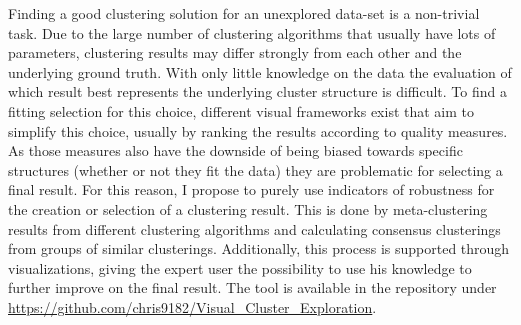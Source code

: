 \iffalse  \fi

Finding a good clustering solution for an unexplored data-set is a non-trivial task. Due to the large number of clustering algorithms that usually have lots of parameters, clustering results may differ strongly from each other and the underlying ground truth. With only little knowledge on the data the evaluation of which result best represents the underlying cluster structure is difficult. To find a fitting selection for this choice, different visual frameworks exist that aim to simplify this choice, usually by ranking the results according to quality measures. As those measures also have the downside of being biased towards specific structures (whether or not they fit the data) they are problematic for selecting a final result. For this reason, I propose to purely use indicators of robustness for the creation or selection of a clustering result. This is done by meta-clustering results from different clustering algorithms and calculating consensus clusterings from groups of similar clusterings. Additionally, this process is supported through visualizations, giving the expert user the possibility to use his knowledge to further improve on the final result. The tool is available in the repository under \url{https://github.com/chris9182/Visual_Cluster_Exploration}.
